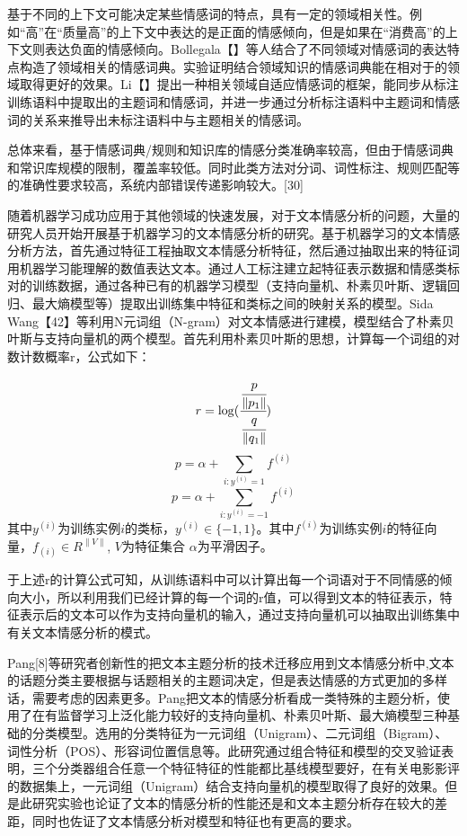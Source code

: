 基于不同的上下文可能决定某些情感词的特点，具有一定的领域相关性。例如“高”在“质量高”的上下文中表达的是正面的情感倾向，但是如果在“消费高”的上下文则表达负面的情感倾向。Bollegala【】等人结合了不同领域对情感词的表达特点构造了领域相关的情感词典。实验证明结合领域知识的情感词典能在相对于的领域取得更好的效果。Li【】提出一种相关领域自适应情感词的框架，能同步从标注训练语料中提取出的主题词和情感词，并进一步通过分析标注语料中主题词和情感词的关系来推导出未标注语料中与主题相关的情感词。

总体来看，基于情感词典/规则和知识库的情感分类准确率较高，但由于情感词典和常识库规模的限制，覆盖率较低。同时此类方法对分词、词性标注、规则匹配等的准确性要求较高，系统内部错误传递影响较大。[30]


随着机器学习成功应用于其他领域的快速发展，对于文本情感分析的问题，大量的研究人员开始开展基于机器学习的文本情感分析的研究。基于机器学习的文本情感分析方法，首先通过特征工程抽取文本情感分析特征，然后通过抽取出来的特征词用机器学习能理解的数值表达文本。通过人工标注建立起特征表示数据和情感类标对的训练数据，通过各种已有的机器学习模型（支持向量机、朴素贝叶斯、逻辑回归、最大熵模型等）提取出训练集中特征和类标之间的映射关系的模型。Sida Wang【42】等利用N元词组（N-gram）对文本情感进行建模，模型结合了朴素贝叶斯与支持向量机的两个模型。首先利用朴素贝叶斯的思想，计算每一个词组的对数计数概率r，公式如下：


$$r=\log(\cfrac{\cfrac{p}{\|p_1\|}}{\cfrac{q}{\|q_1\|}})$$
$$p=\alpha + \sum_{i:y^{(i)}=1}f^{(i)}$$
$$p=\alpha + \sum_{i:y^{(i)}=-1}f^{(i)}$$
其中$y^{(i)}$为训练实例$i$的类标，$y^{(i)}\in\lbrace-1,1\rbrace$。其中$f^{(i)}$为训练实例$i$的特征向量，$f_{(i)}\in R^{\|V\|}$, $V$为特征集合 $\alpha$为平滑因子。

于上述r的计算公式可知，从训练语料中可以计算出每一个词语对于不同情感的倾向大小，所以利用我们已经计算的每一个词的r值，可以得到文本的特征表示，特征表示后的文本可以作为支持向量机的输入，通过支持向量机可以抽取出训练集中有关文本情感分析的模式。

Pang[8]等研究者创新性的把文本主题分析的技术迁移应用到文本情感分析中,文本的话题分类主要根据与话题相关的主题词决定，但是表达情感的方式更加的多样话，需要考虑的因素更多。Pang把文本的情感分析看成一类特殊的主题分析，使用了在有监督学习上泛化能力较好的支持向量机、朴素贝叶斯、最大熵模型三种基础的分类模型。选用的分类特征为一元词组（Unigram）、二元词组（Bigram）、词性分析（POS）、形容词位置信息等。此研究通过组合特征和模型的交叉验证表明，三个分类器组合任意一个特征特征的性能都比基线模型要好，在有关电影影评的数据集上，一元词组（Unigram）结合支持向量机的模型取得了良好的效果。但是此研究实验也论证了文本的情感分析的性能还是和文本主题分析存在较大的差距，同时也佐证了文本情感分析对模型和特征也有更高的要求。

